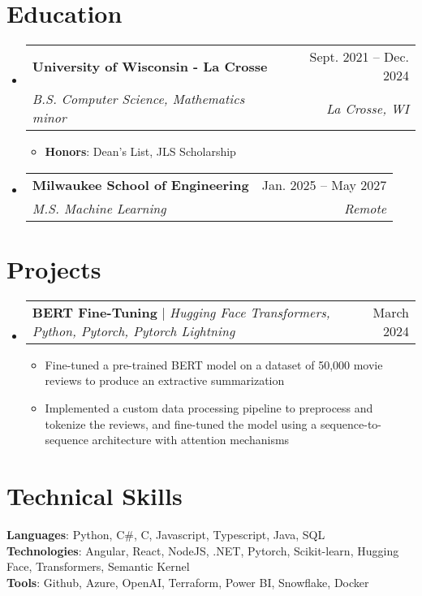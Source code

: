 \documentclass[letterpaper,11pt]{article}
\makeatletter
\newcommand{\resumeItem}[1]{
  \item\small{
    {#1 \vspace{-2pt}}
  }
}
\newcommand{\resumeSubheading}[4]{
  \vspace{-2pt}\item
    \begin{tabular*}{0.97\textwidth}[t]{l@{\extracolsep{\fill}}r}
      \textbf{#1} & #2 \\
      \textit{\small#3} & \textit{\small #4} \\
    \end{tabular*}\vspace{-7pt}
}
\newcommand{\resumeSubSubheading}[2]{
    \item
    \begin{tabular*}{0.97\textwidth}{l@{\extracolsep{\fill}}r}
      \textit{\small#1} & \textit{\small #2} \\
    \end{tabular*}\vspace{-7pt}
}
\newcommand{\resumeProjectHeading}[2]{
    \item
    \begin{tabular*}{0.97\textwidth}{l@{\extracolsep{\fill}}r}
      \small#1 & #2 \\
    \end{tabular*}\vspace{-7pt}
}
\newcommand{\resumeSubHeadingListStart}{\begin{itemize}[leftmargin=0.15in, label={}]}
\newcommand{\resumeSubHeadingListEnd}{\end{itemize}}
\newcommand{\resumeItemListStart}{\begin{itemize}}
\newcommand{\resumeItemListEnd}{\end{itemize}\vspace{-5pt}}
\makeatother
\begin{document}
\section{Education}
  \resumeSubHeadingListStart
    \resumeSubheading
      {University of Wisconsin - La Crosse}{Sept. 2021 -- Dec. 2024}
      {B.S. Computer Science, Mathematics minor }
      {La Crosse, WI}
      \resumeItemListStart
        \resumeItem{\textbf{Honors}: Dean's List, JLS Scholarship}
      \resumeItemListEnd
    \resumeSubheading
      {Milwaukee School of Engineering}{Jan. 2025 -- May 2027}
      {M.S. Machine Learning}
      {Remote}
  \resumeSubHeadingListEnd


\section{Projects}
\resumeSubHeadingListStart         

\resumeProjectHeading
{\textbf{BERT Fine-Tuning} $|$ \emph{Hugging Face Transformers, Python, Pytorch, Pytorch Lightning}}{March 2024}
\resumeItemListStart
\resumeItem{Fine-tuned a pre-trained BERT model on a dataset of 50,000 movie reviews to produce an extractive summarization}
\resumeItem{Implemented a custom data processing pipeline to preprocess and tokenize the reviews, and fine-tuned the model using a sequence-to-sequence architecture with attention mechanisms}
      \resumeItemListEnd
      \resumeSubHeadingListEnd

\section{Technical Skills}
  \begin{itemize}[leftmargin=0.15in, label={}]
    \small{\item{
    {\textbf{Languages}: Python, C\#, C, Javascript, Typescript, Java, SQL}\\
    {\textbf{Technologies}: Angular, React, NodeJS, .NET, Pytorch, Scikit-learn, Hugging Face, Transformers, Semantic Kernel}\\
    {\textbf{Tools}: Github, Azure, OpenAI, Terraform, Power BI, Snowflake, Docker}}}
\end{itemize}
\end{document}
